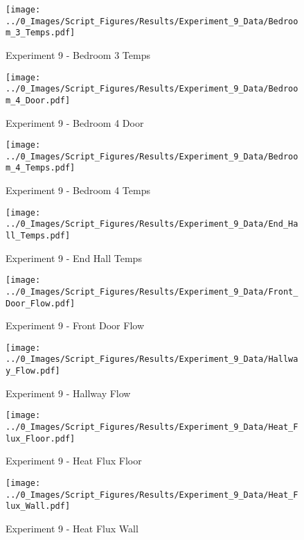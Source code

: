 	\clearpage

	\begin{figure}[H]
		\centering
		\texttt{[image: ../0\_Images/Script\_Figures/Results/Experiment\_9\_Data/Bedroom\_3\_Temps.pdf]}
		\caption[]{Experiment 9 - Bedroom 3 Temps}
	\end{figure}
 

	\begin{figure}[H]
		\centering
		\texttt{[image: ../0\_Images/Script\_Figures/Results/Experiment\_9\_Data/Bedroom\_4\_Door.pdf]}
		\caption[]{Experiment 9 - Bedroom 4 Door}
	\end{figure}
 
	\clearpage

	\begin{figure}[H]
		\centering
		\texttt{[image: ../0\_Images/Script\_Figures/Results/Experiment\_9\_Data/Bedroom\_4\_Temps.pdf]}
		\caption[]{Experiment 9 - Bedroom 4 Temps}
	\end{figure}
 

	\begin{figure}[H]
		\centering
		\texttt{[image: ../0\_Images/Script\_Figures/Results/Experiment\_9\_Data/End\_Hall\_Temps.pdf]}
		\caption[]{Experiment 9 - End Hall Temps}
	\end{figure}
 
	\clearpage

	\begin{figure}[H]
		\centering
		\texttt{[image: ../0\_Images/Script\_Figures/Results/Experiment\_9\_Data/Front\_Door\_Flow.pdf]}
		\caption[]{Experiment 9 - Front Door Flow}
	\end{figure}
 

	\begin{figure}[H]
		\centering
		\texttt{[image: ../0\_Images/Script\_Figures/Results/Experiment\_9\_Data/Hallway\_Flow.pdf]}
		\caption[]{Experiment 9 - Hallway Flow}
	\end{figure}
 
	\clearpage

	\begin{figure}[H]
		\centering
		\texttt{[image: ../0\_Images/Script\_Figures/Results/Experiment\_9\_Data/Heat\_Flux\_Floor.pdf]}
		\caption[]{Experiment 9 - Heat Flux Floor}
	\end{figure}
 

	\begin{figure}[H]
		\centering
		\texttt{[image: ../0\_Images/Script\_Figures/Results/Experiment\_9\_Data/Heat\_Flux\_Wall.pdf]}
		\caption[]{Experiment 9 - Heat Flux Wall}
	\end{figure}
 
